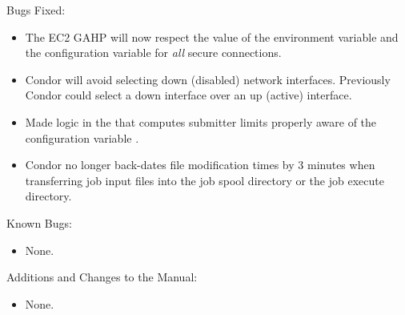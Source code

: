 \noindent Bugs Fixed:

\begin{itemize}

\item The EC2 GAHP will now respect the value of the environment variable
 and the configuration variable
 for \emph{all} secure connections.

\item Condor will avoid selecting down (disabled) network interfaces.  Previously Condor could select a down interface over an up (active) interface.

\item Made logic in the  that computes submitter limits 
properly aware of the configuration variable
.


\item Condor no longer back-dates file modification times by 3 minutes
when transferring job input files into the job spool directory or the job
execute directory.

\end{itemize}

\noindent Known Bugs:

\begin{itemize}

\item None.

\end{itemize}

\noindent Additions and Changes to the Manual:

\begin{itemize}

\item None.

\end{itemize}


